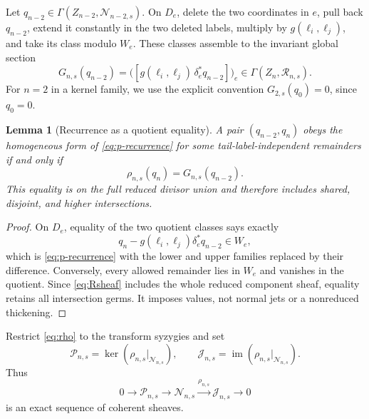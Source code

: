 \documentclass[11pt,reqno]{amsart}
\newtheorem{lemma}[theorem]{Lemma}
\theoremstyle{definition}
\theoremstyle{remark}
\newcommand{\im}{\operatorname{im}}
\begin{document}
Let $q_{n-2}\in\Gamma(Z_{n-2},\mathscr N_{n-2,s})$.  On $D_e$, delete the
two coordinates in $e$, pull back $q_{n-2}$, extend it constantly in the two
deleted labels, multiply by $g(\ell_i,\ell_j)$, and take its class modulo
$W_e$.  These classes assemble to the invariant global section
\begin{equation}
 G_{n,s}(q_{n-2})
 =\bigl([g(\ell_i,\ell_j)\,\delta_e^*q_{n-2}]\bigr)_e
 \in\Gamma(Z_n,\mathscr R_{n,s}).
 \label{eq:G}
\end{equation}
For $n=2$ in a kernel family, we use the explicit convention
$G_{2,s}(q_0)=0$, since $q_0=0$.

\begin{lemma}[Recurrence as a quotient equality]
\label{lem:recurrence-quotient}
A pair $(q_{n-2},q_n)$ obeys the homogeneous form of
\eqref{eq:p-recurrence} for some tail-label-independent remainders if and only
if
\begin{equation}
 \rho_{n,s}(q_n)=G_{n,s}(q_{n-2}).
 \label{eq:rhoG}
\end{equation}
This equality is on the full reduced divisor union and therefore includes
shared, disjoint, and higher intersections.
\end{lemma}

\begin{proof}
On $D_e$, equality of the two quotient classes says exactly
\begin{equation}
 q_n-g(\ell_i,\ell_j)\delta_e^*q_{n-2}\in W_e,
\end{equation}
which is \eqref{eq:p-recurrence} with the lower and upper families replaced by
their difference.  Conversely, every allowed remainder lies in $W_e$ and
vanishes in the quotient.  Since \eqref{eq:Rsheaf} includes the whole reduced
component sheaf, equality retains all intersection germs.  It imposes values,
not normal jets or a nonreduced thickening.
\end{proof}

Restrict \eqref{eq:rho} to the transform syzygies and set
\begin{equation}
 \mathscr P_{n,s}=\ker(\rho_{n,s}|_{\mathscr N_{n,s}}),
 \qquad
 \mathscr J_{n,s}=\im(\rho_{n,s}|_{\mathscr N_{n,s}}).
 \label{eq:PJ}
\end{equation}
Thus
\begin{equation}
 0\longrightarrow\mathscr P_{n,s}
 \longrightarrow\mathscr N_{n,s}
 \xrightarrow{\rho_{n,s}}\mathscr J_{n,s}
 \longrightarrow0
 \label{eq:P-exact}
\end{equation}
is an exact sequence of coherent sheaves.
\end{document}
